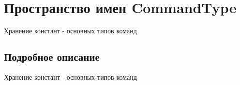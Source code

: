 \hypertarget{namespaceCommandType}{}\section{Пространство имен Command\+Type}
\label{namespaceCommandType}


Хранение констант -\/ основных типов команд  




\subsection{Подробное описание}
Хранение констант -\/ основных типов команд 